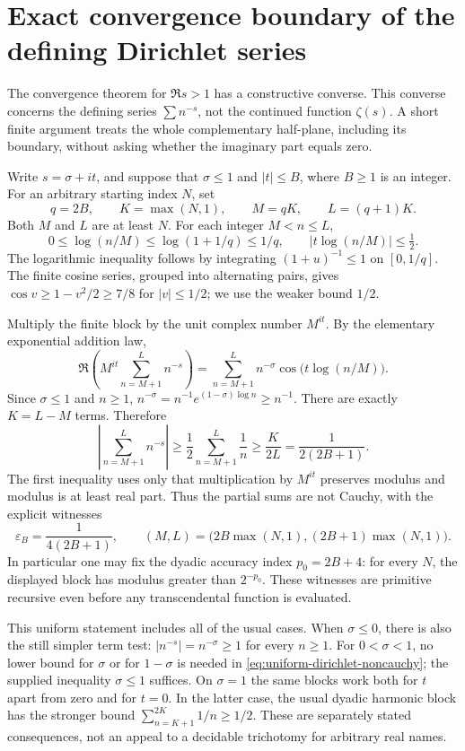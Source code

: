 \section{Exact convergence boundary of the defining Dirichlet series}
\label{sec:dirichlet-divergence}

The convergence theorem for $\Re s>1$ has a constructive converse.
This converse concerns the defining series $\sum n^{-s}$, not the
continued function $\zeta(s)$.  A short finite argument treats the
whole complementary half-plane, including its boundary, without
asking whether the imaginary part equals zero.

Write $s=\sigma+it$, and suppose that $\sigma\le1$ and
$|t|\le B$, where $B\ge1$ is an integer.  For an arbitrary starting
index $N$, set
\[
 q=2B,\qquad K=\max(N,1),\qquad
 M=qK,\qquad L=(q+1)K.
\]
Both $M$ and $L$ are at least $N$.  For each integer $M<n\le L$,
\[
 0\le\log(n/M)\le\log(1+1/q)\le1/q,
 \qquad |t\log(n/M)|\le\tfrac12.                  \tag{V1}
\]
The logarithmic inequality follows by integrating
$(1+u)^{-1}\le1$ on $[0,1/q]$.  The finite cosine series, grouped
into alternating pairs, gives
$\cos v\ge1-v^2/2\ge7/8$ for $|v|\le1/2$; we use the weaker
bound $1/2$.

Multiply the finite block by the unit complex number $M^{it}$.
By the elementary exponential addition law,
\[
 \Re\left(M^{it}\sum_{n=M+1}^{L}n^{-s}\right)
   =\sum_{n=M+1}^{L}n^{-\sigma}\cos\bigl(t\log(n/M)\bigr).
\]
Since $\sigma\le1$ and $n\ge1$,
$n^{-\sigma}=n^{-1}e^{(1-\sigma)\log n}\ge n^{-1}$.
There are exactly $K=L-M$ terms.  Therefore
\begin{equation}
 \boxed{\displaystyle
 \left|\sum_{n=M+1}^{L}n^{-s}\right|
 \ge\frac12\sum_{n=M+1}^{L}\frac1n
 \ge\frac{K}{2L}=\frac1{2(2B+1)}.}
 \label{eq:uniform-dirichlet-noncauchy}
\end{equation}
The first inequality uses only that multiplication by $M^{it}$
preserves modulus and modulus is at least real part.  Thus the
partial sums are not Cauchy, with the explicit witnesses
\[
 \varepsilon_B=\frac1{4(2B+1)},\qquad
 (M,L)=\bigl(2B\max(N,1),(2B+1)\max(N,1)\bigr).
\tag{V2}
\]
In particular one may fix the dyadic accuracy index $p_0=2B+4$:
for every $N$, the displayed block has modulus greater than
$2^{-p_0}$.  These witnesses are primitive recursive even before any
transcendental function is evaluated.

This uniform statement includes all of the usual cases.  When
$\sigma\le0$, there is also the still simpler term test:
$|n^{-s}|=n^{-\sigma}\ge1$ for every $n\ge1$.  For
$0<\sigma<1$, no lower bound for $\sigma$ or for $1-\sigma$ is
needed in \eqref{eq:uniform-dirichlet-noncauchy}; the supplied
inequality $\sigma\le1$ suffices.  On $\sigma=1$ the same blocks
work both for $t$ apart from zero and for $t=0$.  In the latter case,
the usual dyadic harmonic block has the stronger bound
$\sum_{n=K+1}^{2K}1/n\ge1/2$.  These are separately stated
consequences, not an appeal to a decidable trichotomy for arbitrary
real names.

